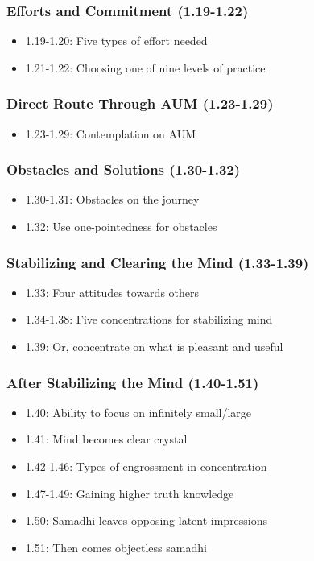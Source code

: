 \begin{frame}[fragile]\frametitle{Efforts and Commitment (1.19-1.22)}
\begin{itemize}
\item 1.19-1.20: Five types of effort needed
\item 1.21-1.22: Choosing one of nine levels of practice
\end{itemize}
\end{frame}

\begin{frame}[fragile]\frametitle{Direct Route Through AUM (1.23-1.29)}
\begin{itemize}
\item 1.23-1.29: Contemplation on AUM
\end{itemize}
\end{frame}

\begin{frame}[fragile]\frametitle{Obstacles and Solutions (1.30-1.32)}
\begin{itemize}
\item 1.30-1.31: Obstacles on the journey
\item 1.32: Use one-pointedness for obstacles
\end{itemize}
\end{frame}

\begin{frame}[fragile]\frametitle{Stabilizing and Clearing the Mind (1.33-1.39)}
\begin{itemize}
\item 1.33: Four attitudes towards others  
\item 1.34-1.38: Five concentrations for stabilizing mind
\item 1.39: Or, concentrate on what is pleasant and useful
\end{itemize}
\end{frame}

\begin{frame}[fragile]\frametitle{After Stabilizing the Mind (1.40-1.51)}
\begin{itemize}  
\item 1.40: Ability to focus on infinitely small/large 
\item 1.41: Mind becomes clear crystal
\item 1.42-1.46: Types of engrossment in concentration
\item 1.47-1.49: Gaining higher truth knowledge
\item 1.50: Samadhi leaves opposing latent impressions
\item 1.51: Then comes objectless samadhi
\end{itemize}
\end{frame}

